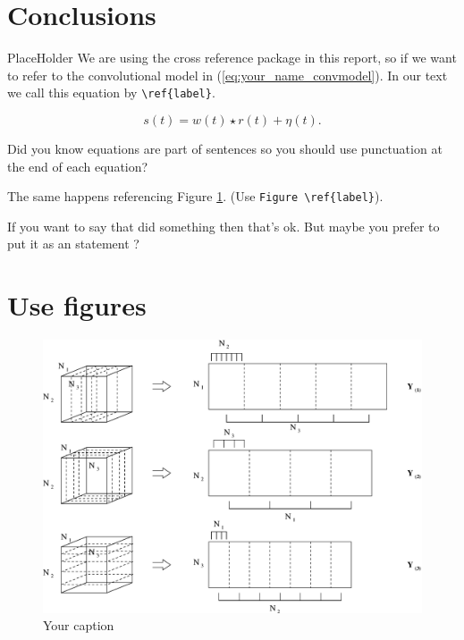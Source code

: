 \section{Conclusions}
PlaceHolder
%
We are using the cross reference package in this report, so if we want to refer to the convolutional model in (\ref{eq:your_name_convmodel}). In our text we call this equation by \verb"\ref{label}". 

\begin{equation}\label{eq:your_name_convmodel}
s(t) = w(t)\star r(t) + \eta(t).
\end{equation}

Did you know equations are part of sentences so you should use punctuation at the end of each equation?

The same happens referencing Figure \ref{fig:your_name_fig1}. (Use \verb"Figure \ref{label}"). 

If you want to say that \cite{VanderBaan2008a} did something then that's ok.
But maybe you prefer to put it as an statement \citep{VanderBaan2008a}?

\section{Use figures}

\begin{figure}[htb]
\begin{center}
\includegraphics[width=0.7\linewidth,angle=0]{your_chapter_bibitem/fig1.eps}
\end{center}
\vspace{-4mm}
\caption{Your caption}
\label{fig:your_name_fig1}
\end{figure}
%

